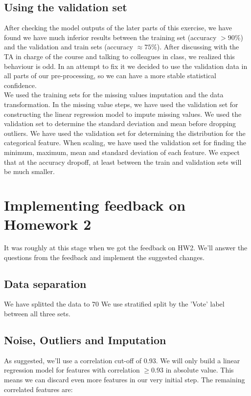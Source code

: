 \documentclass[12pt]{scrartcl}
\begin{document}
\subsection{Using the validation set}
After checking the model outputs of the later parts of this exercise, we have found we have much inferior results between the training set (accuracy $>90\%$) and the validation and train sets (accuracy $\approx 75\%$). 
After discussing with the TA in charge of the course and talking to colleagues in class, we realized this behaviour is odd. In an attempt to fix it we decided to use the validation data in all parts of our pre-processing, so we can have a more stable statistical confidence.\\
We used the training sets for the missing values imputation and the data transformation. In the missing value steps, we have used the validation set for constructing the linear regression model to impute missing values. We used the validation set to determine the standard deviation and mean before dropping outliers. We have used the validation set for determining the distribution for the categorical feature. When scaling, we have used the validation set for finding the minimum, maximum, mean and standard deviation of each feature. We expect that at the accuracy dropoff, at least between the train and validation sets will be much smaller.

\section{Implementing feedback on Homework 2}
It was roughly at this stage when we got the feedback on HW2. We'll answer the questions from the feedback and implement the suggested changes.
\subsection{Data separation}
We have splitted the data to 70%
We use stratified split by the 'Vote' label between all three sets.
\subsection{Noise, Outliers and Imputation}
As suggested, we'll use a correlation cut-off of 0.93. We will only build a linear regression model for features with correlation $\geq 0.93$ in absolute value. This means we can discard even more features in our very initial step. The remaining correlated features are:\\
\end{document}
